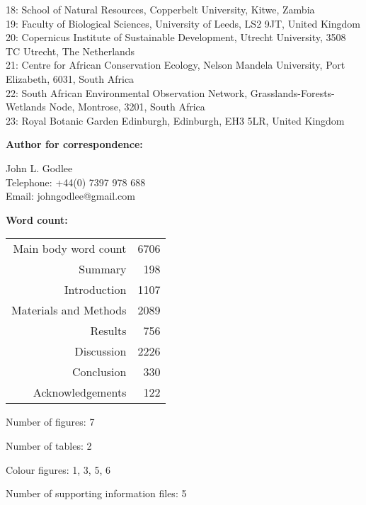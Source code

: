 \documentclass[11pt,a4paper]{article}
\begin{document}
18: School of Natural Resources, Copperbelt University, Kitwe, Zambia \\
19: Faculty of Biological Sciences, University of Leeds, LS2 9JT, United Kingdom\\
20: Copernicus Institute of Sustainable Development, Utrecht University, 3508 TC Utrecht, The Netherlands \\
21: Centre for African Conservation Ecology, Nelson Mandela University, Port Elizabeth, 6031, South Africa \\
22: South African Environmental Observation Network, Grasslands-Forests-Wetlands Node, Montrose, 3201, South Africa \\
23: Royal Botanic Garden Edinburgh, Edinburgh, EH3 5LR, United Kingdom \\

\newpage{}

\textbf{Author for correspondence:}

John L. Godlee \\
Telephone: +44(0) 7397 978 688 \\
Email: johngodlee@gmail.com \\

\vspace{1cm}

\textbf{Word count:}

\vspace{0.2cm}

\begin{tabular}{r|r}
Main body word count & 6706\\
Summary & 198\\
Introduction & 1107\\
Materials and Methods & 2089\\
Results & 756\\
Discussion & 2226\\
Conclusion & 330\\
Acknowledgements & 122\\
\end{tabular}

\vspace{1cm}

Number of figures: 7

Number of tables: 2

Colour figures: 1, 3, 5, 6

Number of supporting information files: 5
\end{document}
